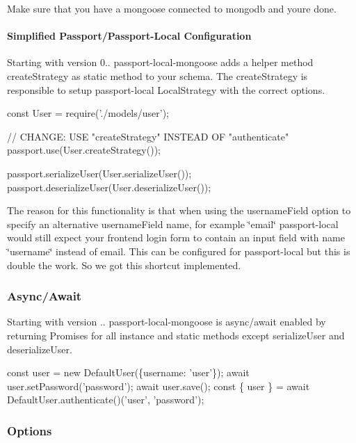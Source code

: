 Make sure that you have a mongoose connected to mongodb and you\textquotesingle{}re done.

\paragraph*{Simplified Passport/\+Passport-\/\+Local Configuration}

Starting with version 0.. passport-\/local-\/mongoose adds a helper method {\ttfamily create\+Strategy} as static method to your schema. The {\ttfamily create\+Strategy} is responsible to setup passport-\/local {\ttfamily Local\+Strategy} with the correct options.


\begin{DoxyCode}
const User = require('./models/user');

// CHANGE: USE "createStrategy" INSTEAD OF "authenticate"
passport.use(User.createStrategy());

passport.serializeUser(User.serializeUser());
passport.deserializeUser(User.deserializeUser());
\end{DoxyCode}


The reason for this functionality is that when using the {\ttfamily username\+Field} option to specify an alternative username\+Field name, for example \char`\"{}email\char`\"{} passport-\/local would still expect your frontend login form to contain an input field with name \char`\"{}username\char`\"{} instead of email. This can be configured for passport-\/local but this is double the work. So we got this shortcut implemented.

\subsubsection*{Async/\+Await}

Starting with version {..} passport-\/local-\/mongoose is async/await enabled by returning Promises for all instance and static methods except {\ttfamily serialize\+User} and {\ttfamily deserialize\+User}.


\begin{DoxyCode}
const user = new DefaultUser(\{username: 'user'\});
await user.setPassword('password');
await user.save();
const \{ user \} = await DefaultUser.authenticate()('user', 'password');
\end{DoxyCode}


\subsubsection*{Options}

